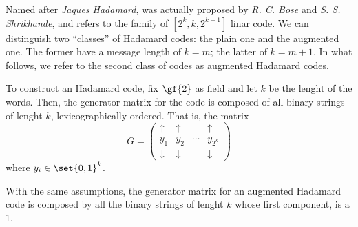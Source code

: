 \documentclass{subfiles}
\begin{document}
    Named after \emph{Jaques Hadamard}, was actually proposed by \emph{R. C. Bose} and 
        \emph{S. S. Shrikhande}, and refers to the family of \([2^{k}, k, 2^{k - 1}]\)
        linar code. We can distinguish two ``classes'' of Hadamard codes: 
        the plain one and the augmented one. The former have a message length of 
        \(k = m\); the latter of \(k = m + 1\). In what follows, we refer to the 
        second class of codes as augmented Hadamard codes.

    To construct an Hadamard code, fix \(\gf{2}\) as field and let \(k\) be the 
        lenght of the words. Then, the generator matrix for the code is composed of 
        all binary strings of lenght \(k\), lexicographically ordered. That is,
        the matrix 
        \[G = \begin{pmatrix}
                \uparrow & \uparrow & & \uparrow \\ 
                y_{1} & y_{2} & \cdots & y_{2^{k}} \\ 
                \downarrow & \downarrow & & \downarrow
            \end{pmatrix}\]
        where \(y_{i} \in \set{0, 1}^{k}\).

    With the same assumptions, the generator matrix for an augmented Hadamard code 
        is composed by all the binary strings of lenght \(k\) whose first component,
        is a 1.
\end{document}
